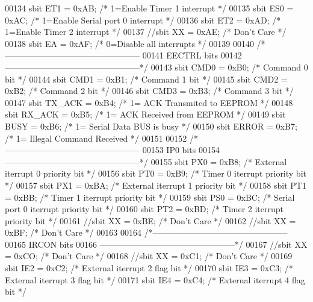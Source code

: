 \begin{DoxyCode}
00134 sbit ET1  = 0xAB;       \textcolor{comment}{/* 1=Enable Timer 1 interrupt */}
00135 sbit ES0  = 0xAC;       \textcolor{comment}{/* 1=Enable Serial port 0 interrupt */}
00136 sbit ET2  = 0xAD;       \textcolor{comment}{/* 1=Enable Timer 2 interrupt */}
00137 \textcolor{comment}{//sbit XX   = 0xAE; /* Don't Care */}
00138 sbit EA   = 0xAF;       \textcolor{comment}{/* 0=Disable all interrupts */}
00139 
00140 \textcolor{comment}{/*------------------------------------------------}
00141 \textcolor{comment}{EECTRL bits}
00142 \textcolor{comment}{------------------------------------------------*/}
00143 sbit CMD0   = 0xB0;       \textcolor{comment}{/* Command 0 bit */}
00144 sbit CMD1   = 0xB1;       \textcolor{comment}{/* Command 1 bit */}
00145 sbit CMD2   = 0xB2;       \textcolor{comment}{/* Command 2 bit */}
00146 sbit CMD3   = 0xB3;       \textcolor{comment}{/* Command 3 bit */}
00147 sbit TX_ACK = 0xB4;       \textcolor{comment}{/* 1= ACK Transmited to EEPROM */}
00148 sbit RX_ACK = 0xB5;   \textcolor{comment}{/* 1= ACK Received from EEPROM */}
00149 sbit BUSY   = 0xB6;   \textcolor{comment}{/* 1= Serial Data BUS is busy */}
00150 sbit ERROR  = 0xB7;       \textcolor{comment}{/* 1= Illegal Command Received */}
00151 
00152 \textcolor{comment}{/*------------------------------------------------}
00153 \textcolor{comment}{IP0 bits}
00154 \textcolor{comment}{------------------------------------------------*/}
00155 sbit PX0  = 0xB8; \textcolor{comment}{/* External iterrupt 0 priority bit */}
00156 sbit PT0  = 0xB9; \textcolor{comment}{/* Timer 0 iterrupt priority bit */}
00157 sbit PX1  = 0xBA; \textcolor{comment}{/* External iterrupt 1 priority bit */}
00158 sbit PT1  = 0xBB; \textcolor{comment}{/* Timer 1 iterrupt priority bit */}
00159 sbit PS0  = 0xBC; \textcolor{comment}{/* Serial port 0 iterrupt priority bit */}
00160 sbit PT2  = 0xBD; \textcolor{comment}{/* Timer 2 iterrupt priority bit */}
00161 \textcolor{comment}{//sbit XX   = 0xBE; /* Don't Care */}
00162 \textcolor{comment}{//sbit XX   = 0xBF; /* Don't Care */}
00163 
00164 \textcolor{comment}{/*------------------------------------------------}
00165 \textcolor{comment}{IRCON bits}
00166 \textcolor{comment}{------------------------------------------------*/}
00167 \textcolor{comment}{//sbit XX   = 0xCO; /* Don't Care */}
00168 \textcolor{comment}{//sbit XX   = 0xC1; /* Don't Care */}
00169 sbit IE2  = 0xC2; \textcolor{comment}{/* External iterrupt 2 flag bit */}
00170 sbit IE3  = 0xC3; \textcolor{comment}{/* External iterrupt 3 flag bit */}
00171 sbit IE4  = 0xC4; \textcolor{comment}{/* External iterrupt 4 flag bit */}

\end{DoxyCode}
